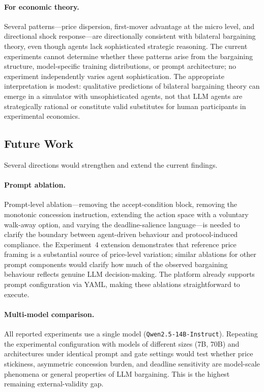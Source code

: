 \paragraph{For economic theory.}
Several patterns---price dispersion, first-mover advantage at the micro level, and directional shock response---are directionally consistent with bilateral bargaining theory, even though agents lack sophisticated strategic reasoning.  The current experiments cannot determine whether these patterns arise from the bargaining structure, model-specific training distributions, or prompt architecture; no experiment independently varies agent sophistication.  The appropriate interpretation is modest: qualitative predictions of bilateral bargaining theory can emerge in a simulator with unsophisticated agents, not that LLM agents are strategically rational or constitute valid substitutes for human participants in experimental economics.

\subsection{Future Work}

Several directions would strengthen and extend the current findings.

\paragraph{Prompt ablation.}
Prompt-level ablation---removing the accept-condition block, removing the monotonic concession instruction, extending the action space with a voluntary walk-away option, and varying the deadline-salience language---is needed to clarify the boundary between agent-driven behaviour and protocol-induced compliance.  the Experiment~4 extension demonstrates that reference price framing is a substantial source of price-level variation; similar ablations for other prompt components would clarify how much of the observed bargaining behaviour reflects genuine LLM decision-making.  The platform already supports prompt configuration via YAML, making these ablations straightforward to execute.

\paragraph{Multi-model comparison.}
All reported experiments use a single model (\texttt{Qwen2.5-14B-Instruct}).  Repeating the experimental configuration with models of different sizes (7B, 70B) and architectures under identical prompt and gate settings would test whether price stickiness, asymmetric concession burden, and deadline sensitivity are model-scale phenomena or general properties of LLM bargaining.  This is the highest remaining external-validity gap.

